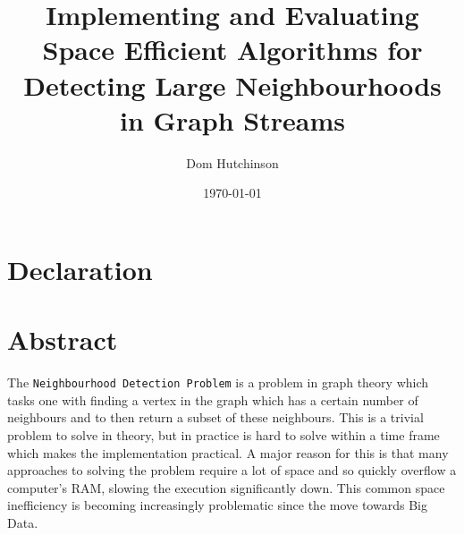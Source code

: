 \documentclass[11pt,twoside,a4paper]{report}
\begin{document}
\renewcommand{\headrulewidth}{0pt}
\newcommand{\ie}{\textit{i.e.} }
\newcommand{\nats}{\mathbb{N} }
\newcommand{\horizontalline}{\newline\vspace{.3cm}\hfill\makebox[.5\linewidth]{\rule{.5\textwidth}{0.4pt}}\hfill\vspace{.05cm}}

\newcommand{\smallsim}{\smallsym{\mathrel}{\sim}}

\makeatletter
\newcommand{\smallsym}[2]{#1{\mathpalette\make@small@sym{#2}}}
\newcommand{\make@small@sym}[2]{%
  \vcenter{\hbox{$\m@th\downgrade@style#1#2$}}%
}
\newcommand{\downgrade@style}[1]{%
  \ifx#1\displaystyle\scriptstyle\else
    \ifx#1\textstyle\scriptstyle\else
      \scriptscriptstyle
  \fi\fi
}
\makeatother

\renewcommand\thetable{\arabic{table}} %
\renewcommand{\thefigure}{\arabic{chapter}.\arabic{section}.\arabic{figure}}


\pagestyle{fancy}
\fancyhead[C]{}
\fancyhead[R]{\today}

\DontPrintSemicolon

\title{Implementing and Evaluating Space Efficient Algorithms for Detecting Large Neighbourhoods in Graph Streams}
\author{Dom Hutchinson}
\date{\today}
\maketitle
\newpage

\chapter*{Declaration}

\tableofcontents
\newpage

\chapter*{Abstract}

\par The \texttt{Neighbourhood Detection Problem} is a problem in graph theory which tasks one with finding a vertex in the graph which has a certain number of neighbours and to then return a subset of these neighbours. This is a trivial problem to solve in theory, but in practice is hard to solve within a time frame which makes the implementation practical. A major reason for this is that many approaches to solving the problem require a lot of space and so quickly overflow a computer's RAM, slowing the execution significantly down. This common space inefficiency is becoming increasingly problematic since the move towards Big Data.
\end{document}
